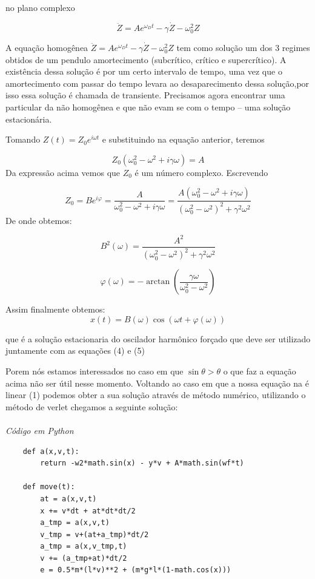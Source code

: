 \documentclass[dvipsnames,a4paper,12pt]{article}
\begin{document}
no plano complexo

\[\ddot{Z} = Ae^{\omega_D{t}} -\gamma\dot{Z} -\omega_{0}^2Z\]

A equação homogênea $\ddot{Z} = Ae^{\omega_D{t}} -\gamma\dot{Z} -\omega_{0}^2Z$ tem como solução um dos 3 regimes obtidos de um pendulo amortecimento (subcrítico, crítico e supercrítico). A existência dessa solução é por um certo intervalo de tempo, uma vez que o amortecimento com passar do tempo levara ao desaparecimento dessa solução,por isso essa solução é chamada de transiente.
Precisamos agora encontrar uma particular da não homogênea e que não evam se com o tempo – uma solução estacionária.

Tomando $Z(t) = Z_0e^{i\omega{t}}$ e substituindo na equação anterior, teremos

\begin{equation}
	Z_0(\omega_0^2 - \omega^2 + i\gamma\omega) = A
\end{equation}
Da expressão acima vemos que $Z_0$ é um número complexo. Escrevendo

\[Z_0 = Be^{i\varphi} = \frac{A}{\omega_0^2 - \omega^2 + i\gamma\omega} = \frac{A(\omega_0^2 - \omega^2 + i\gamma\omega)}{(\omega_0^2 - \omega^2)^2 + \gamma^2\omega^2}\]
De onde obtemos:

\begin{equation}
	B^2(\omega) = \frac{A^2}{(\omega_0^2 - \omega^2)^2 + \gamma^2\omega^2}
\end{equation}

\begin{equation}
	\varphi(\omega) = -\arctan\left(\frac{\gamma\omega}{\omega_{0}^2 - \omega^2}\right)
\end{equation}

Assim finalmente obtemos:
\begin{equation}
	x(t) = B(\omega)\cos(\omega{t} + \varphi(\omega))
\end{equation}

que é a solução estacionaria do oscilador harmônico forçado que deve ser utilizado juntamente com as equações (4) e (5)

Porem nós estamos interessados no caso em que $\sin\theta > \theta$ o que faz a equação acima não ser útil nesse momento. Voltando ao caso em que a nossa equação na é linear (1) podemos obter a sua solução através de método numérico, utilizando o método de verlet chegamos a seguinte solução:

\paragraph{}
\textit{Código em Python}
\begin{lstlisting}
	def a(x,v,t):
		return -w2*math.sin(x) - y*v + A*math.sin(wf*t)
	
	def move(t):
		at = a(x,v,t)
		x += v*dt + at*dt*dt/2
		a_tmp = a(x,v,t)
		v_tmp = v+(at+a_tmp)*dt/2 
		a_tmp = a(x,v_tmp,t)
		v += (a_tmp+at)*dt/2
		e = 0.5*m*(l*v)**2 + (m*g*l*(1-math.cos(x)))
\end{lstlisting}
\end{document}
